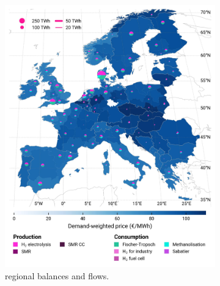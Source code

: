 \documentclass[final,5p,times,twocolumn,sort&compress]{elsarticle}
\begin{document}
\begin{figure}[htbp]
  \centering
  \begin{subfigure}[t]{0.49\textwidth}
      \vspace{0pt}
      \includegraphics[width=1\textwidth]{maps/no-pipelines-no-pcipmi/base_s_adm___2050-balance_map_H2}
      \vspace{-0.5cm}
      \caption{ regional balances and flows.}
      \label{fig:DI_lt_2050_h2}
  \end{subfigure}
  \hfill
  \begin{subfigure}[t]{0.49\textwidth}
      \vspace{0pt}

\end{subfigure}
\end{figure}
\end{document}
